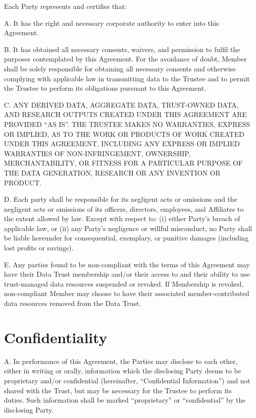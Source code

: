 \documentclass[]{book}
\begin{document}
Each Party represents and certifies that:

A. It has the right and necessary corporate authority to enter into this Agreement.

B. It has obtained all necessary consents, waivers, and permission to fulfil the purposes contemplated by this Agreement. For the avoidance of doubt, Member shall be solely responsible for obtaining all necessary consents and otherwise complying with applicable law in transmitting data to the Trustee and to permit the Trustee to perform its obligations pursuant to this Agreement.

C. ANY DERIVED DATA, AGGREGATE DATA, TRUST-OWNED DATA, AND RESEARCH OUTPUTS CREATED UNDER THIS AGREEMENT ARE PROVIDED ``AS IS''. THE TRUSTEE MAKES NO WARRANTIES, EXPRESS OR IMPLIED, AS TO THE WORK OR PRODUCTS OF WORK CREATED UNDER THIS AGREEMENT, INCLUDING ANY EXPRESS OR IMPLIED WARRANTIES OF NON-INFRINGEMENT, OWNERSHIP, MERCHANTABILITY, OR FITNESS FOR A PARTICULAR PURPOSE OF THE DATA GENERATION, RESEARCH OR ANY INVENTION OR PRODUCT.

D. Each party shall be responsible for its negligent acts or omissions and the negligent acts or omissions of its officers, directors, employees, and Affiliates to the extent allowed by law. Except with respect to: (i) either Party's breach of applicable law, or (ii) any Party's negligence or willful misconduct, no Party shall be liable hereunder for consequential, exemplary, or punitive damages (including lost profits or savings).

E. Any parties found to be non-compliant with the terms of this Agreement may have their Data Trust membership and/or their access to and their ability to use trust-managed data resources suspended or revoked. If Membership is revoked, non-compliant Member may choose to have their associated member-contributed data resources removed from the Data Trust.

\hypertarget{confidentiality}{%
\chapter{Confidentiality}\label{confidentiality}}

A. In performance of this Agreement, the Parties may disclose to each other, either in writing or orally, information which the disclosing Party deems to be proprietary and/or confidential (hereinafter, ``Confidential Information'') and not shared with the Trust, but may be necessary for the Trustee to perform its duties. Such information shall be marked ``proprietary'' or ``confidential'' by the disclosing Party.
\end{document}
